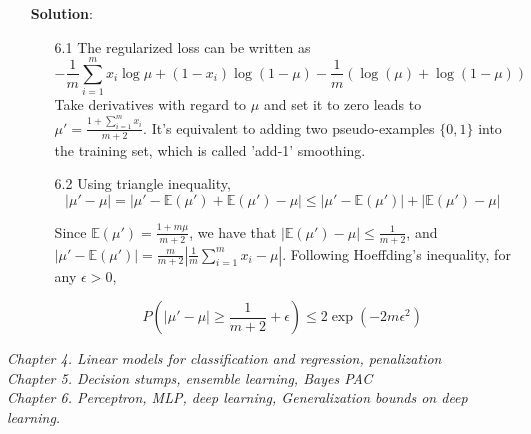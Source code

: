 \documentclass{article}
\begin{document}
\begin{itemize}
\item[] \textbf{Solution}:
	\begin{itemize}
	\item[6.1] The regularized loss can be written as 
	\begin{equation*}
	-\frac{1}{m}\sum_{i=1}^m x_i\log \mu + (1-x_i)\log(1-\mu) - \frac{1}{m} (\log( \mu)+\log(1- \mu))
	\end{equation*}
Take derivatives with regard to $\mu$ and set it to zero leads to $\mu'=\frac{1+\sum_{i=1}^m x_i}{m+2}$. It's equivalent to adding two pseudo-examples $\{0,1\}$ into the training set, which is called 'add-1' smoothing.
	\item[6.2] Using triangle inequality,
	\begin{equation*}
	|\mu'-\mu| = |\mu'-\mathbb{E}(\mu')+\mathbb{E}(\mu')-\mu| \leq |\mu'-\mathbb{E}(\mu')| + |\mathbb{E}(\mu')-\mu|
	\end{equation*}

	Since $\mathbb{E}(\mu')=\frac{1+m\mu}{m+2}$, we have that $|\mathbb{E}(\mu')-\mu|\leq \frac{1}{m+2}$, and $|\mu'-\mathbb{E}(\mu')|=\frac{m}{m+2}|\frac{1}{m}\sum_{i=1}^m x_i -\mu|$. Following Hoeffding's inequality, for any $\epsilon>0$, 
	
	\begin{equation*}
	P\left(|\mu'-\mu|\geq \frac{1}{m+2} +\epsilon \right) \leq 2\exp\left( -2m\epsilon^2 \right)
	\end{equation*}
	
	\end{itemize}


\end{itemize}
\textit{
	Chapter 4. Linear models for classification and regression, penalization \\
	  Chapter 5. Decision stumps, ensemble learning, Bayes PAC \\
      Chapter 6. Perceptron, MLP, deep learning, Generalization bounds on deep learning.}
\end{document}
